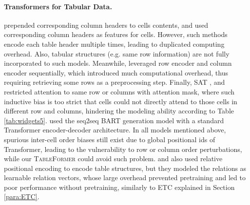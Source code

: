\documentclass[11pt]{article}
\begin{document}
\paragraph{Transformers for Tabular Data.}  
\citet{yin20acl} prepended  corresponding column headers to cells contents, and \citet{chen2019tabfact} used corresponding column headers as features for cells. However, such methods encode each table header multiple times, leading to duplicated computing overhead.  Also, tabular structures (e.g. same row information) are not fully incorporated to such models. Meanwhile, \citet{yin20acl} leveraged row encoder and column encoder sequentially, which introduced much computational overhead, thus requiring retrieving some rows as a preprocessing step. Finally, SAT \cite{zhang2020table}, \citet{deng2020turl} and \citet{wang2021tuta} restricted attention to same row or columns with attention mask, where such inductive bias is too strict that cells could not directly attend to those cells in different row and columns, hindering the modeling ability according to Table \ref{tab:widgets5}. \citet{liu2021tapex} used the seq2seq BART generation model with a standard Transformer encoder-decoder architecture.  In all models mentioned above, spurious inter-cell order biases still exist due to global positional ids of Transformer, leading to the vulnerability to row or column order perturbations, while our \textsc{TableFormer} could avoid such problem. \citet{muller2019answering} and \citet{wang2019rat} also used relative positional encoding to encode table structures, but they modeled the relations as learnable relation vectors, whose large overhead prevented pretraining and led to poor performance without pretraining, similarly to ETC \cite{ainslie2020etc} explained in Section \ref{para:ETC}. 
\end{document}
